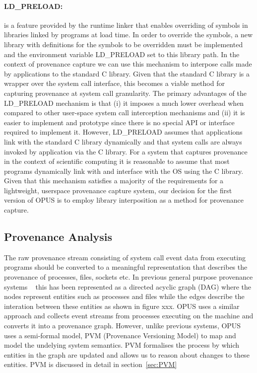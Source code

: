 \documentclass[withindex,glossary]{cam-thesis}
\begin{document}
\paragraph{LD\_PRELOAD:} is a feature provided by the runtime linker that enables overriding of symbols in libraries linked by programs at load time. In order to override the symbols, a new library with definitions for the symbols to be overridden must be implemented and the environment variable LD\_PRELOAD set to this library path. In the context of provenance capture we can use this mechanism to interpose calls made by applications to the standard C library. Given that the standard C library is a wrapper over the system call interface, this becomes a viable method for capturing provenance at system call granularity.
The primary advantages of the LD\_PRELOAD mechanism is that (i) it imposes a much lower overhead when compared to other user-space system call interception mechanisms and (ii) it is easier to implement and prototype since there is no special API or interface required to implement it.
However, LD\_PRELOAD assumes that applications link with the standard C library dynamically and that system calls are always invoked by application via the C library.
For a system that captures provenance in the context of scientific computing it is reasonable to assume that most programs dynamically link with and interface with the OS using the C library. Given that this mechanism satisfies a majority of the requirements for a lightweight, userspace provenance capture system, our decision for the first version of OPUS is to employ library interposition as a method for provenance capture.


\subsection{Provenance Analysis} 
The raw provenance stream consisting of system call event data from executing programs should be converted to a meaningful representation that describes the provenance of processes, files, sockets etc.
In previous general purpose provenance systems ~\cite{PASS, PASSv2} this has been represented as a directed acyclic graph (DAG) where the nodes represent entities such as processes and files while the edges describe the interation between these entities as shown in figure xxx.
OPUS uses a similar approach and collects event streams from processes executing on the machine and converts it into a provenance graph.
However, unlike previous systems, OPUS uses a semi-formal model, PVM (Provenance Versioning Model) to map and model the undelying system semantics.
PVM formalises the process by which entities in the graph are updated and allows us to reason about changes to these entities.
PVM is discussed in detail in section~\ref{sec:PVM}
\end{document}
